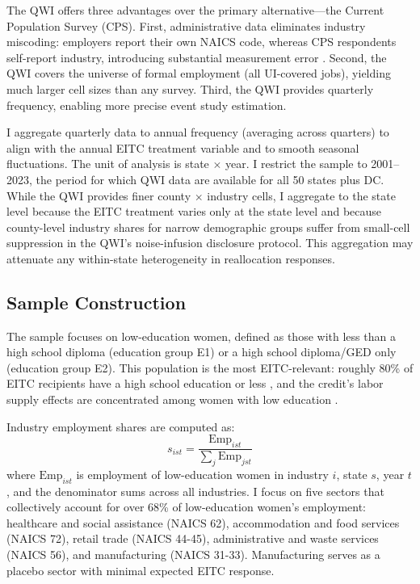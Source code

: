 \documentclass[12pt]{article}
\begin{document}
The QWI offers three advantages over the primary alternative---the Current Population Survey (CPS). First, administrative data eliminates industry miscoding: employers report their own NAICS code, whereas CPS respondents self-report industry, introducing substantial measurement error \citep{abraham2013, bound2001}. Second, the QWI covers the universe of formal employment (all UI-covered jobs), yielding much larger cell sizes than any survey. Third, the QWI provides quarterly frequency, enabling more precise event study estimation.

I aggregate quarterly data to annual frequency (averaging across quarters) to align with the annual EITC treatment variable and to smooth seasonal fluctuations. The unit of analysis is state $\times$ year. I restrict the sample to 2001--2023, the period for which QWI data are available for all 50 states plus DC. While the QWI provides finer county $\times$ industry cells, I aggregate to the state level because the EITC treatment varies only at the state level and because county-level industry shares for narrow demographic groups suffer from small-cell suppression in the QWI's noise-infusion disclosure protocol. This aggregation may attenuate any within-state heterogeneity in reallocation responses.

\subsection{Sample Construction}

The sample focuses on low-education women, defined as those with less than a high school diploma (education group E1) or a high school diploma/GED only (education group E2). This population is the most EITC-relevant: roughly 80\% of EITC recipients have a high school education or less \citep{nichols2016}, and the credit's labor supply effects are concentrated among women with low education \citep{eissa1996, meyer2001}.

Industry employment shares are computed as:
\begin{equation}
s_{ist} = \frac{\text{Emp}_{ist}}{\sum_j \text{Emp}_{jst}}
\label{eq:share}
\end{equation}
where $\text{Emp}_{ist}$ is employment of low-education women in industry $i$, state $s$, year $t$, and the denominator sums across all industries. I focus on five sectors that collectively account for over 68\% of low-education women's employment: healthcare and social assistance (NAICS 62), accommodation and food services (NAICS 72), retail trade (NAICS 44-45), administrative and waste services (NAICS 56), and manufacturing (NAICS 31-33). Manufacturing serves as a placebo sector with minimal expected EITC response.
\end{document}
